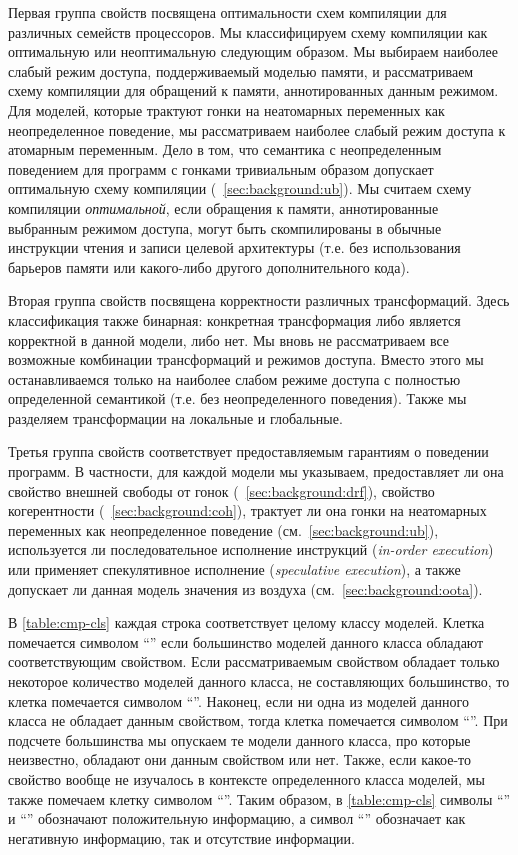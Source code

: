 Первая группа свойств посвящена оптимальности схем компиляции 
для различных семейств  процессоров. 
Мы классифицируем схему компиляции как оптимальную 
или неоптимальную следующим образом. 
Мы выбираем наиболее слабый режим доступа, 
поддерживаемый моделью памяти, и рассматриваем 
схему компиляции для обращений к памяти, аннотированных данным режимом. 
Для моделей, которые трактуют гонки на неатомарных переменных 
как неопределенное поведение, 
мы рассматриваем наиболее слабый режим доступа к атомарным переменным. 
Дело в том, что семантика с неопределенным поведением 
для программ с гонками тривиальным образом допускает 
оптимальную схему компиляции (\see~\cref{sec:background:ub}).
Мы считаем схему компиляции \emph{оптимальной}, 
если обращения к памяти, аннотированные выбранным режимом доступа, 
могут быть скомпилированы в обычные инструкции чтения 
и записи целевой архитектуры 
(т.е. без использования барьеров памяти или какого-либо другого дополнительного кода).

Вторая группа свойств посвящена корректности различных трансформаций. 
Здесь классификация также бинарная: конкретная трансформация 
либо является корректной в данной модели, либо нет. 
Мы вновь не рассматриваем все возможные комбинации 
трансформаций и режимов доступа. 
Вместо этого мы останавливаемся только на наиболее слабом режиме доступа с  полностью определенной семантикой (т.е. без неопределенного поведения).
Также  мы разделяем трансформации на локальные и глобальные. 

Третья группа свойств соответствует предоставляемым гарантиям
о поведении программ. В частности, для каждой модели
мы указываем, предоставляет ли она свойство 
внешней свободы от гонок \eDRF (\see~\cref{sec:background:drf}),
свойство когерентности (\see~\cref{sec:background:coh}),
 трактует ли она гонки на неатомарных переменных как неопределенное поведение (см.~\cref{sec:background:ub}),
используется ли последовательное исполнение инструкций (\emph{in-order execution}) 
или применяет спекулятивное исполнение (\emph{speculative execution}),
а также допускает ли данная модель значения из воздуха (см.~\cref{sec:background:oota}).

В \cref{table:cmp-cls} каждая строка соответствует целому классу моделей. 
Клетка помечается символом ``\cmark\xspace'' если большинство моделей 
данного класса обладают соответствующим свойством. 
Если рассматриваемым свойством обладает только некоторое количество моделей данного класса, 
не составляющих большинство, то клетка помечается символом ``\wmark\xspace''.
Наконец, если ни одна из моделей данного класса не обладает данным свойством, 
тогда клетка помечается символом ``\xmark\xspace''.
При подсчете большинства 
мы опускаем те модели данного класса, про которые неизвестно, обладают 
они данным свойством или нет. 
Также, если какое-то свойство вообще не изучалось 
в контексте определенного класса моделей, 
мы также помечаем клетку символом ``\xmark''. 
Таким образом, в \cref{table:cmp-cls} символы ``\cmark\xspace'' и ``\wmark\xspace'' 
обозначают положительную информацию, а символ ``\xmark\xspace'' обозначает 
как негативную информацию, так и отсутствие информации. 

